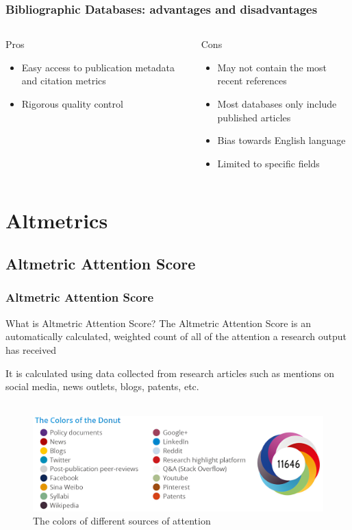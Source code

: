 \documentclass{beamer}
\newcommand{\pros}{\item[{\textcolor[HTML]{3C8031}{\ding{51}}}]}
\newcommand{\cons}{\item[\textcolor{red}{\ding{54}}]}
\begin{document}
\begin{frame}
    \frametitle{Bibliographic Databases: advantages and disadvantages}
    \begin{columns}[T]
        \begin{column}{.5\textwidth}
            \centering Pros
            \begin{itemize}[<+->]
                \pros Easy access to publication metadata and citation metrics
                \pros Rigorous quality control
            \end{itemize}
        \end{column}
        \begin{column}{.5\textwidth}
            \centering Cons
            \begin{itemize}[<+->]
                \cons May not contain the most recent references
                \cons Most databases only include published articles
                \cons Bias towards English language
                \cons Limited to specific fields
            \end{itemize}
        \end{column}
    \end{columns}
\end{frame}


\section{Altmetrics}
\subsection{Altmetric Attention Score}
\begin{frame}
    \frametitle{Altmetric Attention Score}
    \begin{block}{What is Altmetric Attention Score?}
        The Altmetric Attention Score is an automatically calculated, weighted count of all of the attention a research output has received
    \end{block}

    It is calculated using data collected from research articles such as mentions
    on social media, news outlets, blogs, patents, etc.\\~\

    \begin{figure}[h]
        \includegraphics[height=0.42\textheight]{altscore.png}
        \caption{The colors of different sources of attention}
    \end{figure}
\end{frame}
\end{document}
